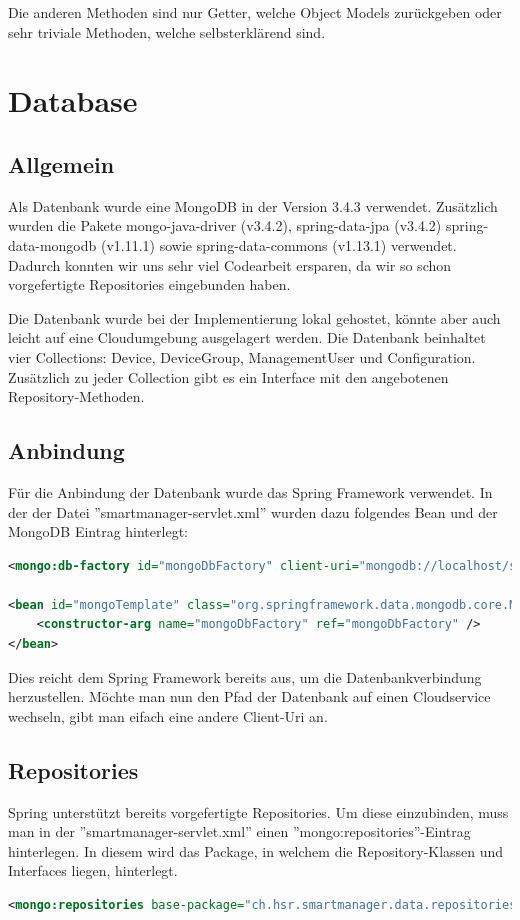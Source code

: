 Die anderen Methoden sind nur Getter, welche Object Models zurückgeben oder sehr triviale Methoden, welche selbsterklärend sind.

\newpage

\section{Database}
\subsection{Allgemein}
Als Datenbank wurde eine MongoDB in der Version 3.4.3 verwendet. Zusätzlich wurden die Pakete mongo-java-driver (v3.4.2), spring-data-jpa (v3.4.2) spring-data-mongodb (v1.11.1) sowie spring-data-commons (v1.13.1) verwendet. Dadurch konnten wir uns sehr viel Codearbeit ersparen, da wir so schon vorgefertigte Repositories eingebunden haben.

Die Datenbank wurde bei der Implementierung lokal gehostet, könnte aber auch leicht auf eine Cloudumgebung ausgelagert werden. Die Datenbank beinhaltet vier Collections: Device, DeviceGroup, ManagementUser und Configuration. Zusätzlich zu jeder Collection gibt es ein Interface mit den angebotenen Repository-Methoden.
\subsection{Anbindung}
Für die Anbindung der Datenbank wurde das Spring Framework verwendet. In der der Datei ''smartmanager-servlet.xml'' wurden dazu folgendes Bean und der MongoDB Eintrag hinterlegt:
\begin{lstlisting}[language=xml]
<mongo:db-factory id="mongoDbFactory" client-uri="mongodb://localhost/smartmanager" />

<bean id="mongoTemplate" class="org.springframework.data.mongodb.core.MongoTemplate">
	<constructor-arg name="mongoDbFactory" ref="mongoDbFactory" />
</bean>
\end{lstlisting}
Dies reicht dem Spring Framework bereits aus, um die Datenbankverbindung herzustellen. Möchte man nun den Pfad der Datenbank auf einen Cloudservice wechseln, gibt man eifach eine andere Client-Uri an.

\subsection{Repositories}
Spring unterstützt bereits vorgefertigte Repositories. Um diese einzubinden, muss man in der ''smartmanager-servlet.xml'' einen ''mongo:repositories''-Eintrag hinterlegen. In diesem wird das Package, in welchem die Repository-Klassen und Interfaces liegen, hinterlegt.
\begin{lstlisting}[language=xml]
<mongo:repositories base-package="ch.hsr.smartmanager.data.repositories" />
\end{lstlisting}

